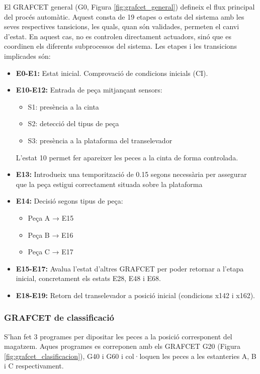 \documentclass[a4paper,11pt,DIV=13,headings=normal,abstract=true,twoside=semi]{article}
\begin{document}
El GRAFCET general (G0, Figura \ref{fig:grafcet_general}) defineix el flux principal del procés automàtic. Aquest consta de 19 etapes o estats del sistema amb les seves respectives tansicions, les quals, quan són validades, permeten el canvi d'estat. En aquest cas, no es controlen directament actuadors, sinó que es coordinen els diferents subprocessos del sistema. Les etapes i les transicions implicades són:

\begin{itemize}[leftmargin=*, nosep]
\item \textbf{E0-E1:} Estat inicial. Comprovació de condicions inicials (CI).
\item \textbf{E10-E12:} Entrada de peça mitjançant sensors:
\begin{itemize}[nosep]
      \item S1: presència a la cinta
  \item S2: detecció del tipus de peça
  \item S3: presència a la plataforma del transelevador
  \end{itemize}
    L'estat 10 permet fer apareixer les peces a la cinta de forma controlada.
\item \textbf{E13:} Introdueix una temporització de 0.15 segons necessària per assegurar que la peça estigui correctament situada sobre la plataforma

\item \textbf{E14:} Decisió segons tipus de peça:
\begin{itemize}[nosep]
 \item Peça A → E15
  \item Peça B → E16
  \item Peça C → E17
  \end{itemize}

\item \textbf{E15-E17:} Avalua l'estat d'altres GRAFCET per poder retornar a l'etapa inicial, concretament els estats E28, E48 i E68.

\item \textbf{E18-E19:} Retorn del transelevador a posició inicial (condicions x142 i x162).

\end{itemize}

   
\subsubsection{GRAFCET de classificació}

S'han fet 3 programes per dipositar les peces a la posició corresponent del magatzem. Aques programes es correponen amb els GRAFCET G20 (Figura \ref{fig:grafcet_clasificacion}), G40 i G60 i col·loquen les peces a les estanteries A, B i C respectivament.
\end{document}
